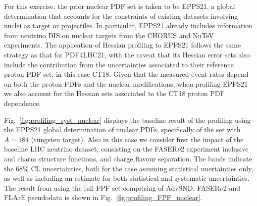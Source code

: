 For this exercise, the prior nuclear PDF set is taken to be EPPS21, a global determination
that accounts for the constraints of existing datasets involving nuclei as target or projectiles.
%
In particular, EPPS21 already includes information from neutrino DIS on nuclear targets
from the CHORUS and NuTeV experiments.
%
The application of Hessian profiling to EPPS21 follows the same strategy as that
for PDF4LHC21, with the caveat that its Hessian error sets also include the contribution
from the uncertainties  associated to their reference proton PDF set, in this case CT18.
%
Given that the measured event rates depend on both the proton PDFs and the nuclear modifications,
when profiling EPPS21 we also account for the Hessian sets associated to the CT18 proton
PDF dependence.

Fig.~\ref{fig:profiling_syst_nuclear} displays the baseline result of the profiling using the EPPS21 global determination of nuclear PDFs,
specifically of the set with $A=184$ (tungsten target).
%
Also in this case we consider first the impact of the baseline LHC neutrino dataset, consisting
on the FASER$\nu$2 experiment inclusive and charm structure functions,  and charge flavour
separation. 
The bands indicate the 68\% CL uncertainties, 
both for the case assuming statistical unertainties only, 
as well as including an estimate for both statistical and systematic uncertainties.
The result from using the full FPF set comprising of AdvSND, FASER$\nu$2 and FLArE pseudodata is shown in Fig.~\ref{fig:profiling_FPF_nuclear}.

